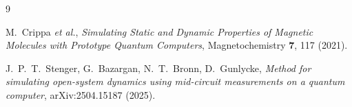 \documentclass[11pt,a4paper]{article}
\begin{document}
\begin{thebibliography}{9}

M.~Crippa \emph{et al.}, \emph{Simulating Static and Dynamic Properties of
Magnetic Molecules with Prototype Quantum Computers}, Magnetochemistry
\textbf{7}, 117 (2021).

J.~P.~T.~Stenger, G.~Bazargan, N.~T.~Bronn, D.~Gunlycke, \emph{Method for
simulating open-system dynamics using mid-circuit measurements on a
quantum computer}, arXiv:2504.15187 (2025).

\end{thebibliography}
\end{document}
